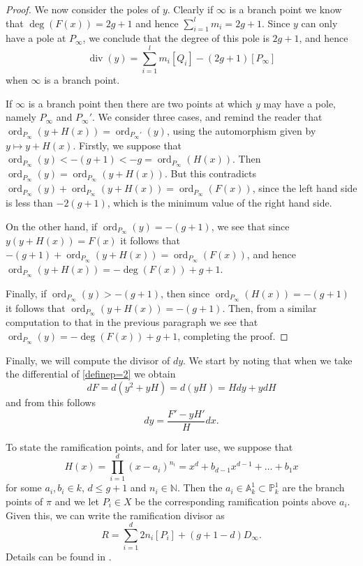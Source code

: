 \documentclass[draft, 11pt]{article} %
\theoremstyle{plain}
\theoremstyle{remark}
\DeclareMathOperator{\ord}{ord}
\DeclareMathOperator{\di}{div}
\begin{document}
\begin{proof}
We now consider the poles of $y$.
Clearly if $\infty$ is a branch point we know that $\deg(F(x)) = 2g+1$ and hence $\sum_{i=1}^l m_i = 2g+1$.
Since $y$ can only have a pole at $P_\infty$, we conclude that the degree of this pole is $2g+1$, and hence
\[
\di(y) = \sum_{i=1}^l m_i [Q_i] - (2g+1)[P_\infty]
\]
when $\infty$ is a branch point.

If $\infty$ is a branch point then there are two points at which $y$ may have a pole, namely $P_\infty$ and $P_\infty'$.
We consider three cases, and remind the reader that $\ord_{P_\infty}(y + H(x)) = \ord_{P_\infty'}(y)$, using the automorphism given by $y \mapsto y+H(x)$.
Firstly, we suppose that $\ord_{P_\infty}(y) < -(g+1) < -g = \ord_{P_\infty}(H(x))$.
Then $ \ord_{P_\infty}(y) = \ord_{P_\infty}(y+H(x))$.
But this contradicts $\ord_{P_\infty}(y) + \ord_{P_\infty}(y+H(x)) = \ord_{P_\infty}(F(x))$, since the left hand side is less than $-2(g+1)$, which is the minimum value of the right hand side.

On the other hand, if $\ord_{P_\infty} (y) = -(g+1)$, we see that since $y(y+H(x)) = F(x)$ it follows that $-(g+1) + \ord_{P_\infty}(y+H(x)) = \ord_{P_\infty}(F(x))$, and hence $\ord_{P_\infty}(y+H(x)) = -\deg(F(x)) + g + 1$.

Finally, if $\ord_{P_\infty}(y) > -(g+1)$, then since $\ord_{P_\infty}(H(x)) = -(g+1)$ it follows that $\ord_{P_\infty} (y+H(x)) = -(g+1)$.
Then, from a similar computation to that in the previous paragraph we see that $\ord_{P_\infty}(y) = -\deg(F(x)) + g +1$, completing the proof.
\end{proof}



Finally, we will compute the divisor of $dy$.
We start by noting that when we take the differential of \eqref{definep=2} we obtain
\[
dF = d\left(y^2 + yH \right) = d(yH) = Hdy + ydH
\]
and from this follows 
\begin{equation}\label{divdyp=2}
dy = \frac{F'-yH'}{H}dx.
\end{equation}


To state the ramification points, and for later use, we suppose that 
\begin{equation}\label{hcoefficients}
H(x) = \prod_{i=1}^d (x-a_i)^{n_i} = x^d + b_{d-1}x^{d-1} + \ldots + b_1x
\end{equation}
for some $a_i, b_i \in  k$, $d \leq g+1$ and $n_i \in \mathbb N$.
Then the $a_i \in \mathbb A_k^1 \subset \mathbb P_k^1$ are the branch points of $\pi$ and we let $P_i \in X$ be the corresponding ramification points above $a_i$.
Given this, we can write the ramification divisor as
\[
R = \sum_{i=1}^d 2n_i[P_i] + (g+1-d)D_\infty.
\]
Details can be found in \cite[\S 6]{faithfulaction}.
\end{document}
